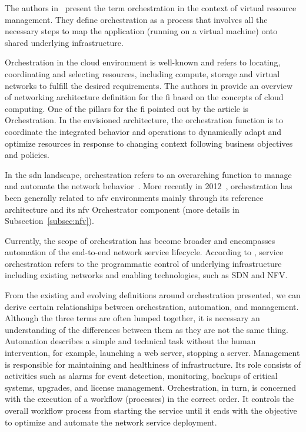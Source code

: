 The authors in~\cite{Grit2006} present the term orchestration in the context of virtual resource management. They define orchestration as a process that involves all the necessary steps to map the application (running on a virtual machine) onto shared underlying infrastructure. 

Orchestration in the cloud environment is well-known and refers to locating, coordinating and selecting resources, including compute, storage and virtual networks to fulfill the desired requirements. The authors in \cite{Galis2009ManagementInternet} provide an overview of networking architecture definition for the \gls{fi} based on the concepts of cloud computing. One of the pillars for the \gls{fi} pointed out by the article is Orchestration. In the envisioned architecture, the orchestration function is to coordinate the integrated behavior and operations to dynamically adapt and optimize resources in response to changing context following business objectives and policies.

In the \gls{sdn} landscape, orchestration refers to an overarching function to manage and automate the network behavior~\cite{5984813}. More recently in 2012~\cite{ETSI2012NetworkAction}, orchestration has been generally related to \gls{nfv} environments mainly through its reference architecture and its \gls{nfv} Orchestrator component (more details in Subsection~\ref{subsec:nfv}).  

Currently, the scope of orchestration has become broader and encompasses automation of the end-to-end network service lifecycle. According to \cite{MEF:Third:2015}, service orchestration refers to the programmatic control of underlying infrastructure including existing networks and enabling technologies, such as SDN and NFV.

From the existing and evolving definitions around orchestration presented, we can derive certain relationships between orchestration, automation, and management. Although the three terms are often lumped together, it is necessary an understanding of the differences between them as they are not the same thing. Automation describes a simple and technical task without the human intervention, for example, launching a web server, stopping a server. Management is responsible for maintaining and healthiness of infrastructure. Its role consists of activities such as alarms for event detection, monitoring, backups of critical systems, upgrades, and license management. Orchestration, in turn, is concerned with the execution of a workflow (processes) in the correct order. It controls the overall workflow process from starting the service until it ends with the objective to optimize and automate the network service deployment. 

